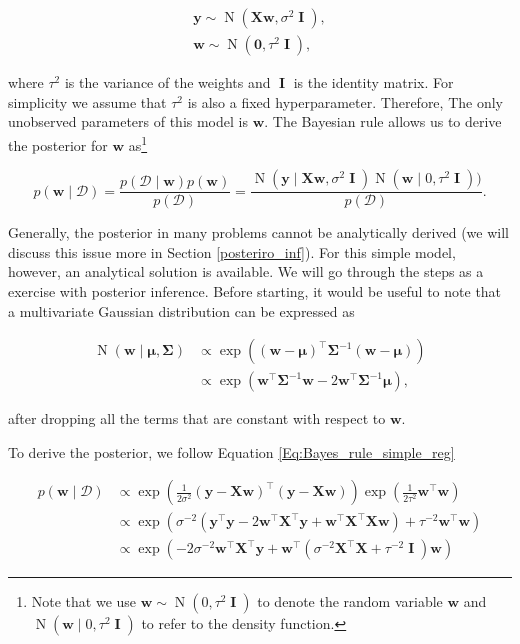 \documentclass[dissertation,math,vertlayout,pdfa,colorlinks]{aaltoseries}
\newcommand{\bw}{\bm{w}}
\newcommand{\bX}{\bm{X}}
\newcommand{\by}{\bm{y}}
\newcommand{\bD}{\mathcal{D}}
\DeclareMathOperator{\eye}{\textbf{I}}
\DeclareMathOperator{\normalpdf}{N}
\newcommand{\tp}{^{\top}}
\begin{document}
\begin{align}\label{Eq:simple_Bayesian_regression} 
\by \sim \normalpdf(\bX\bw,\sigma^2 \eye),\\
\bw \sim \normalpdf(\textbf{0},\tau^2 \eye), \nonumber
\end{align}

\noindent where $\tau^2$ is the variance of the weights and $\eye$ is the identity matrix. For simplicity we assume that $\tau^2$ is also a fixed hyperparameter. Therefore, The only unobserved parameters of this model is $\bw$. The Bayesian rule allows us to derive the posterior for $\bw$ as\footnote{Note that we use $\bw \sim \normalpdf(0,\tau^2 \eye)$ to denote the random variable $\bw$ and $\normalpdf(\bw\mid 0,\tau^2 \eye)$ to refer to the density function.}

\begin{equation}\label{Eq:Bayes_rule_simple_reg}
p(\bw \mid \bD) = \frac{p(\bD \mid \bw)p(\bw)}{p(\bD)} = \frac{\normalpdf(\by \mid \bX \bw,\sigma^2 \eye) \normalpdf(\bw \mid 0,\tau^2 \eye))}{p(\bD)}.
\end{equation}  

Generally, the posterior in many problems cannot be analytically derived (we will discuss this issue more in Section \ref{posteriro_inf}). For this simple model, however, an analytical solution is available. We will go through the steps as a exercise with posterior inference. Before starting, it would be useful to note that a multivariate Gaussian distribution can be expressed as  

\begin{align}\label{Eq:multi_Gauss}
\normalpdf(\bw \mid \bm{\mu},\bm{\Sigma}) &\propto \exp \left ((\bw - \bm{\mu})\tp\bm{\Sigma}^{-1}(\bw - \bm{\mu}) \right) \nonumber\\
&\propto \exp \left ( \bw\tp\bm{\Sigma}^{-1}\bw -  2\bw\tp\bm{\Sigma}^{-1}\bm{\mu} \right),
\end{align}

\noindent after dropping all the terms that are constant with respect to $\bw$. 

To derive the posterior, we follow Equation \ref{Eq:Bayes_rule_simple_reg} 

\begin{align} \label{Eq:lin_rel_simple_derivation}
p(\bw \mid \bD) &\propto \exp \left(\frac{1}{2\sigma^2} (\by - \bX \bw)\tp(\by - \bX \bw)\right) \exp(\frac{1}{2\tau^2}\bw\tp\bw) \nonumber\\ 
&\propto \exp \left (\sigma^{-2}(\by\tp\by - 2\bw\tp\bX\tp\by + \bw\tp\bX\tp\bX\bw)+ \tau^{-2}\bw\tp\bw \right) \nonumber\\
&\propto \exp \left ( -2\sigma^{-2}\bw\tp\bX\tp\by + \bw\tp( \sigma^{-2}\bX\tp\bX + \tau^{-2} \eye )\bw \right) %
\end{align}    
 
\end{document}
